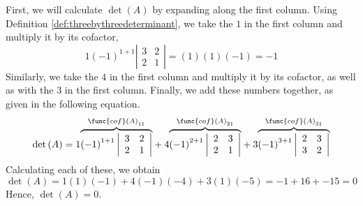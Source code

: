 \begin{solution} First, we will calculate $\det \left(A\right)$ by expanding along the first column.
Using Definition \ref{def:threebythreedeterminant}, we take the $1$ in the first column and multiply it 
by its cofactor,
\begin{equation*}
1  \left( -1\right) ^{1+1}\left|
\begin{array}{rr}
3 & 2 \\
2 & 1
\end{array}
\right| 
=
(1)(1)(-1) = -1 
\end{equation*}
Similarly, we take the $4$ in the first column and multiply it by its cofactor, 
as well as with the $3$ in the first column. Finally, we add these numbers together, as given in the following
equation.
\begin{equation*}
\det \left(A\right) = 
1 \overset{
\func{cof}\left( A\right) _{11}}{\overbrace{\left( -1\right) ^{1+1}\left|
\begin{array}{rr}
3 & 2 \\
2 & 1
\end{array}
\right| }}+4 \overset{\func{cof}\left( A\right) _{21}}{\overbrace{\left(
-1\right) ^{2+1}\left|
\begin{array}{rr}
2 & 3 \\
2 & 1
\end{array}
\right| }}+3 \overset{\func{cof}\left( A\right) _{31}}{\overbrace{\left(
-1\right) ^{3+1}\left|
\begin{array}{rr}
2 & 3 \\
3 & 2
\end{array}
\right| }}
\end{equation*}
Calculating each of these, we obtain
\begin{equation*}
\det \left(A\right)
=
1 \left(1\right)\left(-1\right)
+
4 \left(-1\right)\left(-4\right)
+
3 \left(1\right)\left(-5\right)
=
-1 + 16 + -15
= 
0
\end{equation*}
Hence, $\det\left(A\right) = 0$. 


\end{solution}
